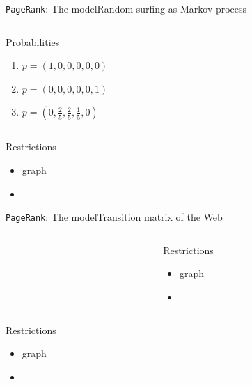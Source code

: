 \documentclass[xcolor=table,final]{beamer} %
\newcommand{\PageRank}{\texttt{PageRank}\xspace}
\begin{document}
\begin{frame}{\PageRank : The model}{Random surfing as Markov process}
\begin{columns}
      \begin{exampleblock}{Probabilities}
        \begin{enumerate}
        \item<2-> $p = (1,0,0,0,0,0)$
        \item<3-> $p = (0,0,0,0,0,1)$
        \item<4-> $p = (0,\frac{2}{5},\frac{2}{5},\frac{1}{5},0)$
        \end{enumerate}
      \end{exampleblock}
  \end{columns}

   \pause
   \begin{block}{Restrictions}
     \begin{itemize}
     \item {} graph
     \item {}
     \end{itemize}
   \end{block}
\end{frame}
\begin{frame}{\PageRank : The model}{Transition matrix of the Web}

  \begin{columns}
    \begin{column}{0.45\textwidth}
    \end{column}
    \begin{column}{0.7\textwidth}

      \begin{exampleblock}{Restrictions}
        \begin{itemize}
        \item {} graph
        \item {}
        \end{itemize}
      \end{exampleblock}
    \end{column}
  \end{columns}

   \pause
   \begin{block}{Restrictions}
     \begin{itemize}
     \item {} graph
     \item {}
     \end{itemize}
   \end{block}
\end{frame}
\end{document}
